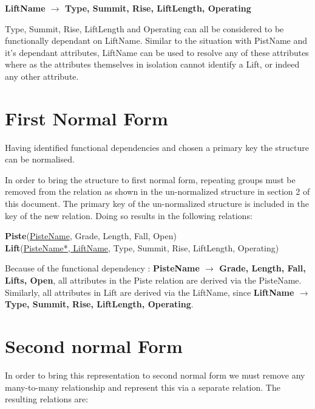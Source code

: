 \documentclass[titlepage ,12pt]{article}
\begin{document}
\textbf{LiftName \begin{math}\rightarrow\end{math} Type, Summit, Rise, LiftLength, Operating}
 
Type, Summit, Rise, LiftLength and Operating can all be considered to be functionally dependant on LiftName. Similar to the situation with PistName and it's dependant attributes, LiftName can be used to resolve any of these attributes where as the attributes themselves in isolation cannot identify a Lift, or indeed any other attribute. 


\section{First Normal Form}
Having identified functional dependencies and chosen a primary key the structure can be normalised.

In order to bring the structure to first normal form, repeating groups must be removed from the relation as shown in the un-normalized structure in section 2 of this document. The primary key of the un-normalized structure is included in the key of the new relation. Doing so results in the following relations:

\textbf{Piste}(\underline{PisteName}, Grade, Length, Fall, Open) \\
\textbf{Lift}(\underline{PisteName*, LiftName}, Type, Summit, Rise, LiftLength, Operating)

Because of the functional dependency : \textbf{PisteName \begin{math}\rightarrow\end{math} Grade, Length, Fall, Lifts, Open}, all attributes in the Piste relation are derived via the PisteName.
Similarly, all attributes in Lift are derived via the LiftName, since \textbf{LiftName \begin{math}\rightarrow\end{math} Type, Summit, Rise, LiftLength, Operating}.

 


\section{Second normal Form}
In order to bring this representation to second normal form we must remove any many-to-many relationship and represent this via a separate relation. The resulting relations are: 
\end{document}
